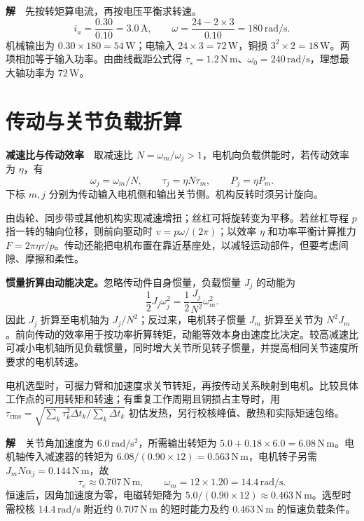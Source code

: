\textbf{解}　先按转矩算电流，再按电压平衡求转速。
\[
i_a=\frac{0.30}{0.10}=3.0\,\mathrm A,\qquad
\omega=\frac{24-2\times3}{0.10}=180\,\mathrm{rad/s}.
\]
机械输出为 $0.30\times180=54\,\mathrm W$；电输入 $24\times3=72\,\mathrm W$，铜损 $3^2\times2=18\,\mathrm W$。两项相加等于输入功率。由曲线截距公式得 $\tau_s=1.2\,\mathrm{N\,m}$、$\omega_0=240\,\mathrm{rad/s}$，理想最大轴功率为 $72\,\mathrm W$。

\FloatBarrier
\section{传动与关节负载折算}
\label{sec:actuator-transmission}

\textbf{减速比与传动效率}　取减速比 $N=\omega_m/\omega_j>1$，电机向负载供能时，若传动效率为 $\eta$，有
\[
\boxed{\omega_j=\omega_m/N,\qquad \tau_j=\eta N\tau_m},\qquad
P_j=\eta P_m .
\]
下标 $m,j$ 分别为传动输入电机侧和输出关节侧。机构反转时须另计旋向。

由齿轮、同步带或其他机构实现减速增扭；丝杠可将旋转变为平移。若丝杠导程 $p$ 指一转的轴向位移，则前向驱动时 $v=p\omega/(2\pi)$；以效率 $\eta$ 和功率平衡计算推力 $F=2\pi\eta\tau/p$。传动还能把电机布置在靠近基座处，以减轻运动部件，但要考虑间隙、摩擦和柔性。

\textbf{惯量折算由动能决定。}忽略传动件自身惯量，负载惯量 $J_j$ 的动能为
\[
\frac12 J_j\omega_j^2=\frac12 \frac{J_j}{N^2}\omega_m^2.
\]
因此 $J_j$ 折算至电机轴为 $J_j/N^2$；反过来，电机转子惯量 $J_m$ 折算至关节为 $N^2J_m$。前向传动的效率用于按功率折算转矩，动能等效本身由速度比决定。较高减速比可减小电机轴所见负载惯量，同时增大关节所见转子惯量，并提高相同关节速度所要求的电机转速。

电机选型时，可据力臂和加速度求关节转矩，再按传动关系映射到电机。比较具体工作点的可用转矩和转速；有重复工作周期且铜损占主导时，用 $\tau_{\mathrm{rms}}=\sqrt{\sum_k\tau_k^2\Delta t_k/\sum_k\Delta t_k}$ 初估发热，另行校核峰值、散热和实际矩速包络。


\textbf{解}　关节角加速度为 $6.0\,\mathrm{rad/s^2}$，所需输出转矩为 $5.0+0.18\times6.0=6.08\,\mathrm{N\,m}$。电机轴传入减速器的转矩为 $6.08/(0.90\times12)=0.563\,\mathrm{N\,m}$，电机转子另需 $J_mN\alpha_j=0.144\,\mathrm{N\,m}$，故
\[
\tau_e\approx0.707\,\mathrm{N\,m},\qquad \omega_m=12\times1.20=14.4\,\mathrm{rad/s}.
\]
恒速后，因角加速度为零，电磁转矩降为 $5.0/(0.90\times12)\approx0.463\,\mathrm{N\,m}$。选型时需校核 $14.4\,\mathrm{rad/s}$ 附近约 $0.707\,\mathrm{N\,m}$ 的短时能力及约 $0.463\,\mathrm{N\,m}$ 的恒速负载条件。

